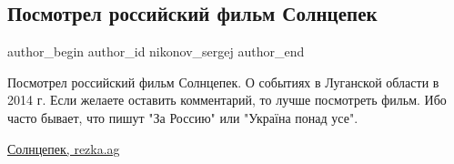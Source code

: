  
 
 
 
 
 
\subsection{Посмотрел российский фильм Солнцепек}
\label{sec:03_11_2021.fb.nikonov_sergej.1.solncepek_film}
 
\ifcmt
 author_begin
   author_id nikonov_sergej
 author_end
\fi

Посмотрел российский фильм Солнцепек. О событиях в Луганской области в 2014 г.
Если желаете оставить комментарий, то лучше посмотреть фильм. Ибо часто бывает,
что пишут "За Россию" или "Україна понад усе". 

\href{https://rezka.ag/films/drama/41224-solncepek-2021.html}{%
Солнцепек, rezka.ag%
}

